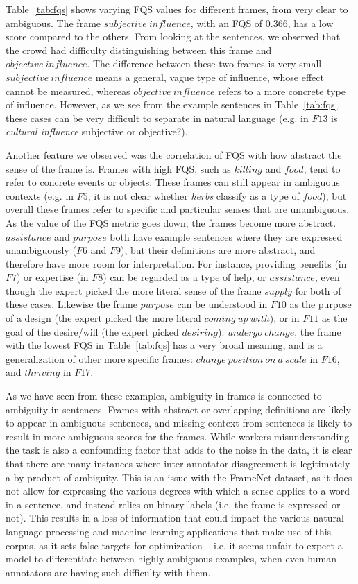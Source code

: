 Table~\ref{tab:fqs} shows varying FQS values for different frames, from very clear to ambiguous. The frame $subjective\ influence$, with an FQS of 0.366, has a low score compared to the others. From looking at the sentences, we observed that the crowd had difficulty distinguishing between this frame and $objective\ influence$. The difference between these two frames is very small -- $subjective\ influence$ means a general, vague type of influence, whose effect cannot be measured, whereas $objective\ influence$ refers to a more concrete type of influence. However, as we see from the example sentences in Table~\ref{tab:fqs}, these cases can be very difficult to separate in natural language (e.g. in $F13$ is \textit{cultural influence} subjective or objective?).

Another feature we observed was the correlation of FQS with how abstract the sense of the frame is. Frames with high FQS, such as $killing$ and $food$, tend to refer to concrete events or objects. These frames can still appear in ambiguous contexts (e.g. in $F5$, it is not clear whether \textit{herbs} classify as a type of $food$), but overall these frames refer to specific and particular senses that are unambiguous. As the value of the FQS metric goes down, the frames become more abstract. $assistance$ and $purpose$ both have example sentences where they are expressed unambiguously ($F6$ and $F9$), but their definitions are more abstract, and therefore have more room for interpretation. For instance, providing benefits (in $F7$) or expertise (in $F8$) can be regarded as a type of help, or $assistance$, even though the expert picked the more literal sense of the frame $supply$ for both of these cases. Likewise the frame $purpose$ can be understood in $F10$ as the purpose of a design (the expert picked the more literal $coming\ up\ with$), or in $F11$ as the goal of the desire/will (the expert picked $desiring$). $undergo\ change$, the frame with the lowest FQS in Table~\ref{tab:fqs} has a very broad meaning, and is a generalization of other more specific frames: $change\ position\ on\ a\ scale$ in $F16$, and $thriving$ in $F17$.

As we have seen from these examples, ambiguity in frames is connected to ambiguity in sentences. Frames with abstract or overlapping definitions are likely to appear in ambiguous sentences, and missing context from sentences is likely to result in more ambiguous scores for the frames. While workers misunderstanding the task is also a confounding factor that adds to the noise in the data, it is clear that there are many instances where inter-annotator disagreement is legitimately a by-product of ambiguity. This is an issue with the FrameNet dataset, as it does not allow for expressing the various degrees with which a sense applies to a word in a sentence, and instead relies on binary labels (i.e. the frame is expressed or not). This results in a loss of information that could impact the various natural language processing and machine learning applications that make use of this corpus, as it sets false targets for optimization -- i.e. it seems unfair to expect a model to differentiate between highly ambiguous examples, when even human annotators are having such difficulty with them.


